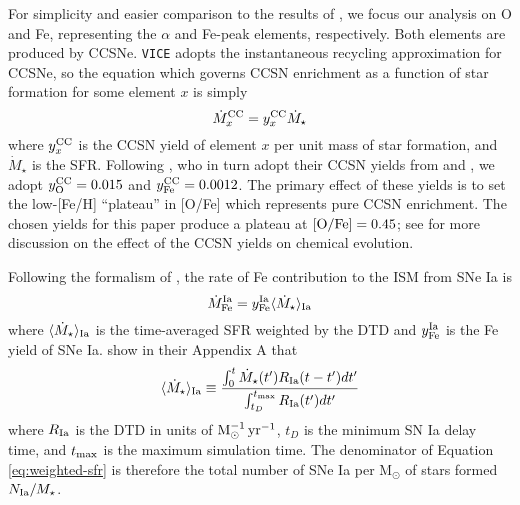 \documentclass[twocolumn,twocolappendix,linenumbers,trackchanges]{aastex631}
\newcommand{\vice}{{\tt VICE}\xspace}
\begin{document}
For simplicity and easier comparison to the results of , we focus our analysis on O and Fe, representing the $\alpha$ and Fe-peak elements, respectively. Both elements are produced by CCSNe. \vice adopts the instantaneous recycling approximation for CCSNe, so the equation which governs CCSN enrichment as a function of star formation for some element $x$ is simply
\begin{equation}
    \dot M_x^{\rm CC} = y_x^{\rm CC} \dot M_\star
    \label{eq:ccsn-enrichment}
\end{equation}
where $y_x^{\rm CC}$ is the CCSN yield of element $x$ per unit mass of star formation, and $\dot M_\star$ is the SFR. 
Following , who in turn adopt their CCSN yields from \citet{ChieffiLimongi2004-CCSNYields} and \citet{LimongiChieffi2006-CCSNYields}, we adopt $y_{\rm O}^{\rm CC}=0.015$ and $y_{\rm Fe}^{\rm CC}=0.0012$. The primary effect of these yields is to set the low-[Fe/H] ``plateau'' in [O/Fe] which represents pure CCSN enrichment. The chosen yields for this paper produce a plateau at ${\rm [O/Fe]}=0.45$; see \citet{Weinberg2023-CCSNYield} for more discussion on the effect of the CCSN yields on chemical evolution.

Following the formalism of \citet{Weinberg2017-ChemicalEquilibrium}, the rate of Fe contribution to the ISM from SNe Ia is 
\begin{equation}
    \dot M_{\rm Fe}^{\rm Ia} = y_{\rm Fe}^{\rm Ia} \langle \dot M_\star\rangle_{\rm Ia} \\
\end{equation}
where $\langle \dot M_\star\rangle_{\rm Ia}$ is the time-averaged SFR weighted by the DTD and $y_{\rm Fe}^{\rm Ia}$ is the Fe yield of SNe Ia. \citet{Weinberg2017-ChemicalEquilibrium} show in their Appendix A that
\begin{equation}
    \langle \dot M_\star\rangle_{\rm Ia} \equiv \frac{\int_0^t \dot M_\star(t')R_{\rm Ia}(t-t')dt'}{\int_{t_D}^{t_{\rm max}} R_{\rm Ia}(t')dt'}
    \label{eq:weighted-sfr}
\end{equation}
where %
$R_{\rm Ia}$ is the DTD in units of ${\rm M}_\odot^{-1}\,{\rm yr}^{-1}$,
$t_D$ is the minimum SN Ia delay time, and $t_{\rm max}$ is the maximum simulation time. The denominator of Equation \ref{eq:weighted-sfr} is therefore the total number of SNe Ia per M$_{\odot}$ of stars formed $N_{\rm Ia}/M_\star$.
\end{document}
